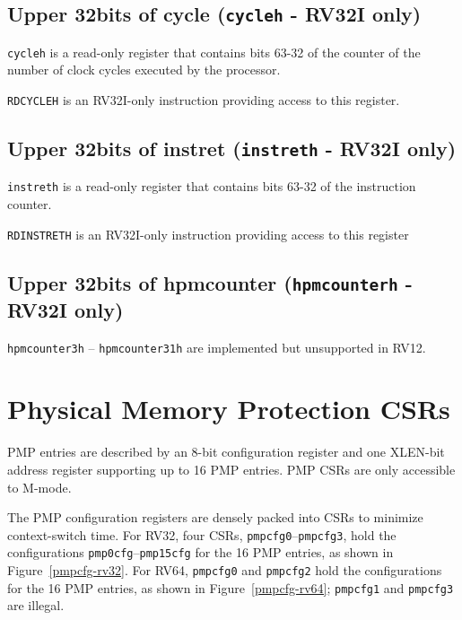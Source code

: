 \subsection{Upper 32bits of cycle (\texttt{cycleh} - RV32I
only)}\label{upper-32bits-of-cycle-cycleh---rv32i-only}

\texttt{cycleh} is a read-only register that contains bits 63-32 of the counter
of the number of clock cycles executed by the processor.

\texttt{RDCYCLEH} is an RV32I-only instruction providing access to this register.

\subsection{Upper 32bits of instret (\texttt{instreth} - RV32I
only)}\label{upper-32bit-of-instret-instreth---rv32i-only}

\texttt{instreth} is a read-only register that contains bits 63-32 of the
instruction counter.

\texttt{RDINSTRETH} is an RV32I-only instruction providing access to this
register

\subsection{Upper 32bits of hpmcounter (\texttt{hpmcounterh} - RV32I
only)} \label{high-performance-monitoring-counters-rv32}

\texttt{hpmcounter3h} -- \texttt{hpmcounter31h} are implemented but unsupported in RV12.




\section{Physical Memory Protection CSRs}

PMP entries are described by an 8-bit configuration register and one XLEN-bit
address register supporting up to 16 PMP entries. PMP CSRs are only accessible to M-mode.

The PMP configuration registers are densely packed into CSRs to minimize
context-switch time.  For RV32, four CSRs, \texttt{pmpcfg0}--\texttt{pmpcfg3}, hold
the configurations \texttt{pmp0cfg}--\texttt{pmp15cfg} for the 16 PMP entries, as
shown in Figure~\ref{pmpcfg-rv32}.  For RV64, \texttt{pmpcfg0} and \texttt{pmpcfg2}
hold the configurations for the 16 PMP entries, as shown in
Figure~\ref{pmpcfg-rv64}; \texttt{pmpcfg1} and \texttt{pmpcfg3} are illegal.

